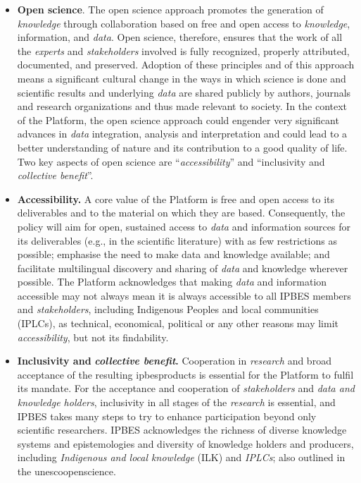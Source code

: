 \documentclass{article}
\begin{document}
\begin{itemize}
    \item \textbf{Open science}. The open science approach promotes the generation of \textit{knowledge }through collaboration based on free and open access to \textit{knowledge}, information, and \textit{data}. Open science, therefore, ensures that the work of all the \textit{experts} and \textit{stakeholders} involved is fully recognized, properly attributed, documented, and preserved. Adoption of these principles and of this approach means a significant cultural change in the ways in which science is done and scientific results and underlying \textit{data} are shared publicly by authors, journals and research organizations and thus made relevant to society. In the context of the Platform, the open science approach could engender very significant advances in \textit{data} integration, analysis and interpretation and could lead to a better understanding of nature and its contribution to a good quality of life. Two key aspects of open science are “\textit{accessibility}” and “inclusivity and \textit{collective benefit}”.
    \item \textbf{Accessibility.} A core value of the Platform is free and open access to its deliverables and to the material on which they are based. Consequently, the policy will aim for open, sustained access to \textit{data} and information sources for its deliverables (e.g., in the scientific literature) with as few restrictions as possible; emphasise the need to make data and knowledge available;  and facilitate multilingual discovery and sharing of \textit{data} and knowledge wherever possible. The Platform acknowledges that making \textit{data} and information accessible may not always mean it is always accessible to all IPBES members and\textit{ stakeholders}, including Indigenous Peoples and local communities (IPLCs), as technical, economical, political or any other reasons may limit \textit{accessibility}, but not its findability.
    \item \textbf{Inclusivity and }\textit{\textbf{collective benefit}}\textbf{.} Cooperation in \textit{research} and broad acceptance of the resulting \gls{ipbesproducts} is essential for the Platform to fulfil its mandate. For the acceptance and cooperation of \textit{stakeholders} and \textit{data and knowledge holders}, inclusivity in all stages of the \textit{research} is essential, and IPBES takes many steps to try to enhance participation beyond only scientific researchers. IPBES acknowledges the richness of diverse knowledge systems and epistemologies and diversity of knowledge holders and producers, including \textit{Indigenous and local knowledge} (ILK) and \textit{IPLCs}; also outlined in the \gls{unescoopenscience}.
\end{itemize}
\end{document}
